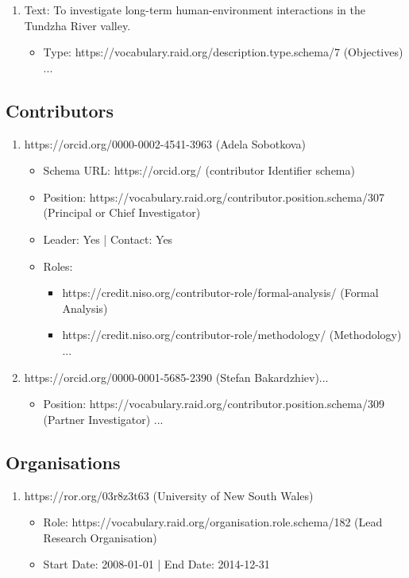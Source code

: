 \begin{framed}
{\begin{enumerate}
\item Text: To investigate long-term human-environment interactions in the Tundzha River valley.
   \begin{itemize}
   \item Type: https://vocabulary.raid.org/description.type.schema/7 (Objectives) ...
   \end{itemize}

\end{enumerate}

\subsection*{Contributors}
\begin{enumerate}

\item https://orcid.org/0000-0002-4541-3963 (Adela Sobotkova)
   \begin{itemize}
   \item Schema URL: https://orcid.org/ (contributor Identifier schema)
   \item Position: https://vocabulary.raid.org/contributor.position.schema/307 (Principal or Chief Investigator)
   \item Leader: Yes | Contact: Yes
   \item Roles:
   \begin{itemize}
   \item https://credit.niso.org/contributor-role/formal-analysis/ (Formal Analysis)
   \item https://credit.niso.org/contributor-role/methodology/ (Methodology) ...
   \end{itemize}
   \end{itemize}

\item https://orcid.org/0000-0001-5685-2390 (Stefan Bakardzhiev)...
   \begin{itemize}
   \item Position: https://vocabulary.raid.org/contributor.position.schema/309 (Partner Investigator) ...
   \end{itemize}
\end{enumerate}

\subsection*{Organisations}
\begin{enumerate}
\item https://ror.org/03r8z3t63 (University of New South Wales)
   \begin{itemize}
   \item Role: https://vocabulary.raid.org/organisation.role.schema/182 (Lead Research Organisation)
   \item Start Date: 2008-01-01 | End Date: 2014-12-31
   \end{itemize}


\end{enumerate}}
\end{framed}
